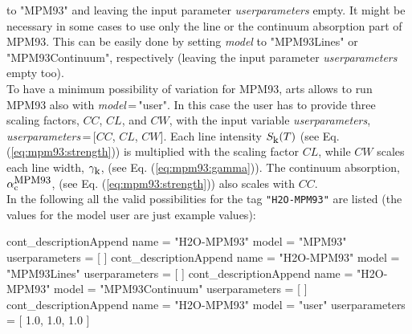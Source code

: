 \begin{itemize}
     to "MPM93" and leaving the input parameter {\it userparameters} empty. 
     It might be necessary in some cases to use only the line or the 
     continuum absorption part of MPM93. This can be easily done 
     by setting {\it model} to "MPM93Lines" or "MPM93Continuum", 
     respectively (leaving the input parameter {\it userparameters} 
     empty too).\\ To have a minimum possibility of variation for MPM93, 
     arts allows to run MPM93 also with {\it model}\,=\,"user". 
     In this case the user has to provide three scaling factors,  
     $CC$, $CL$, and $CW$, with the input variable {\it userparameters}, 
     {\it userparameters}\,=\,$[$$CC$, $CL$, $CW$$]$. 
     Each line intensity $S_{\mbox{\rm \small k}}(T)$ (see Eq. (\ref{eq:mpm93:strength})) 
     is multiplied with the scaling factor $CL$, while $CW$ scales 
     each line width, $\gamma_{\mbox{\rm \small k}}$, (see Eq. (\ref{eq:mpm93:gamma})). 
     The continuum absorption, $\alpha^{\mbox{\rm \small MPM93}}_{\rm c}$, 
     (see Eq. (\ref{eq:mpm93:strength})) also scales with $CC$.\\
     In the following all the valid possibilities for the
     tag {\tt "H2O-MPM93"} are listed (the values for the 
     model user are just example values): 
\begin{code}
cont_descriptionAppend{
    name           = "H2O-MPM93"
    model          = "MPM93"
    userparameters = [ ]
}
cont_descriptionAppend{
    name           = "H2O-MPM93"
    model          = "MPM93Lines"
    userparameters = [ ]
}
cont_descriptionAppend{
    name           = "H2O-MPM93"
    model          = "MPM93Continuum"
    userparameters = [ ]
}
cont_descriptionAppend{
    name           = "H2O-MPM93"
    model          = "user"
    userparameters = [ 1.0, 1.0, 1.0 ]
}
\end{code}


\end{itemize}
